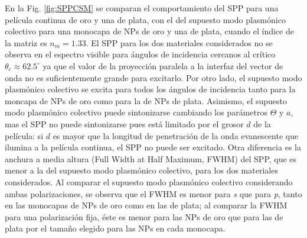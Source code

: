 En la Fig. \ref{fig:SPPCSM} se comparan el comportamiento del SPP para una película continua de oro y una de plata, con el  del supuesto modo  plasmónico colectivo para una monocapa de NPs de oro y una de plata, cuando el índice de la matriz es $n_m=1.33$. El SPP para los dos materiales considerados no se observa en el espectro visible para ángulos de incidencia cercanos al crítico $\theta_c\approx 62.5^\circ$ ya que el valor de la proyección paralela a la interfaz del vector de onda no es suficientemente grande para excitarlo. Por otro lado, el supuesto modo  plasmónico colectivo se excita para todos los ángulos de incidencia tanto para la moncapa de NPs de oro como para la de NPs de plata. Asimismo, el supuesto modo  plasmónico colectivo puede sintonizarse  cambiando los parámetros $\Theta$ y $a$, mas el SPP no puede sintonizarse pues está limitado por el grosor $d$ de la película: si $d$ es mayor que la longitud de penetración de la onda evanescente que ilumina a la película continua, el SPP no puede ser excitado. Otra diferencia es la anchura a media altura (Full Width at Half Maximum, FWHM) del SPP, que es menor a la del supuesto modo  plasmónico colectivo, para los dos materiales considerados. Al comparar el supuesto modo  plasmónico colectivo considerando ambas polarizaciones,  se observa  que el FWHM es menor para \emph{s} que para \emph{p}, tanto en las monocapas de NPs de oro como en las de plata; al comparar la FWHM para una polarización fija, éste es menor para las NPs de oro que para las de plata por el tamaño elegido para las NPs en cada monocapa.

